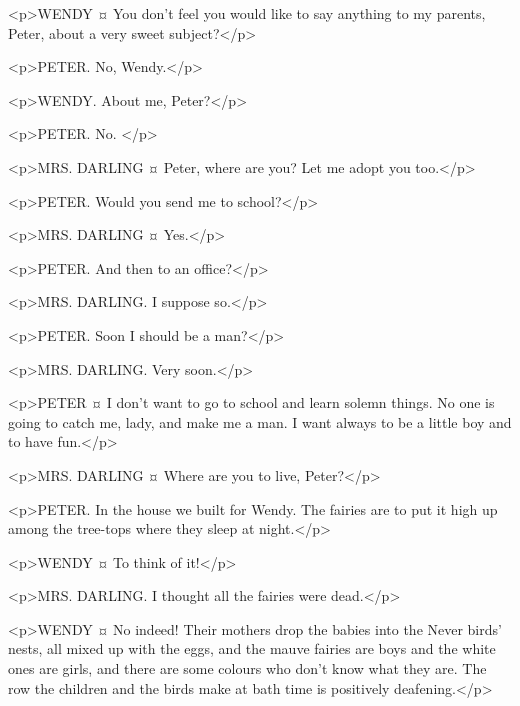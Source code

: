 \begin{drama}

<p>WENDY ¤
You don't feel you would like to say anything to my parents, Peter, about a very sweet subject?</p>

<p>PETER. No, Wendy.</p>

<p>WENDY. About me, Peter?</p>

<p>PETER. No.
</p>

<p>MRS. DARLING ¤
Peter, where are you? Let me adopt you too.</p>


<p>PETER. Would you send me to school?</p>

<p>MRS. DARLING ¤
Yes.</p>

<p>PETER. And then to an office?</p>

<p>MRS. DARLING. I suppose so.</p>

<p>PETER. Soon I should be a man?</p>

<p>MRS. DARLING. Very soon.</p>

<p>PETER ¤
I don't want to go to school and learn solemn things. No one is going to catch me, lady, and make me a man. I want always to be a little boy and to have fun.</p>


<p>MRS. DARLING ¤
Where are you to live, Peter?</p>

<p>PETER. In the house we built for Wendy. The fairies are to put it high up among the tree-tops where they sleep at night.</p>

<p>WENDY ¤
To think of it!</p>

<p>MRS. DARLING. I thought all the fairies were dead.</p>

<p>WENDY ¤
No indeed! Their mothers drop the babies into the Never birds' nests, all mixed up with the eggs, and the mauve fairies are boys and the white ones are girls, and there are some colours who don't know what they are. The row the children and the birds make at bath time is positively deafening.</p>


\end{drama}
